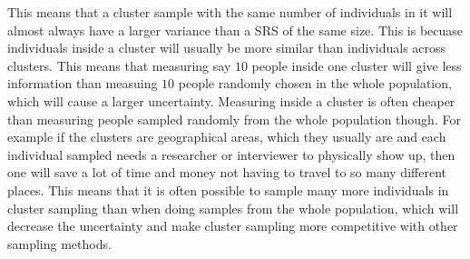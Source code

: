 \documentclass{article}
\begin{document}
This means that a cluster sample with the same number of individuals in it will
almost always have a larger variance than a SRS of the same size. This is
becuase individuals inside a cluster will usually be more similar than
individuals across clusters. This means that measuring say \(10\) people inside
one cluster will give less information than measuing \(10\) people randomly
chosen in the whole population, which will cause a larger uncertainty. Measuring
inside a cluster is often cheaper than measuring people sampled randomly from
the whole population though. For example if the clusters are geographical areas,
which they usually are and each individual sampled needs a researcher or
interviewer to physically show up, then one will save a lot of time and money
not having to travel to so many different places. This means that it is often possible to sample
many more individuals in cluster sampling than when doing samples from the whole
population, which will decrease the uncertainty and make cluster sampling more
competitive with other sampling methods.
\end{document}
